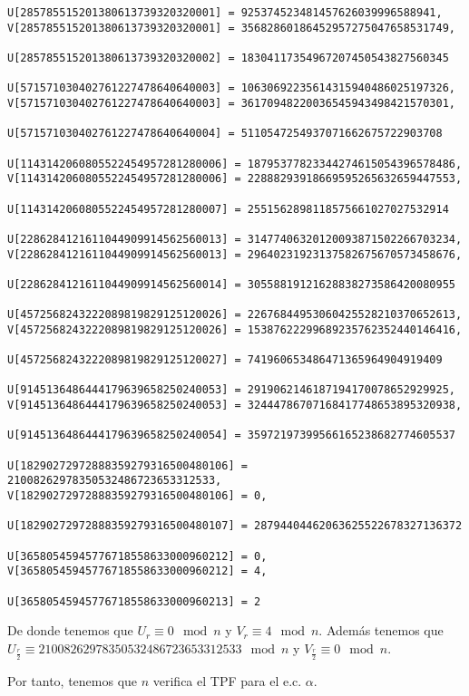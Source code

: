 \documentclass[a4paper]{article}
\begin{document}
\begin{verbatim}
U[285785515201380613739320320001] = 925374523481457626039996588941, 
V[285785515201380613739320320001] = 35682860186452957275047658531749, 

U[285785515201380613739320320002] = 18304117354967207450543827560345

U[571571030402761227478640640003] = 10630692235614315940486025197326, 
V[571571030402761227478640640003] = 36170948220036545943498421570301, 

U[571571030402761227478640640004] = 5110547254937071662675722903708

U[1143142060805522454957281280006] = 18795377823344274615054396578486, 
V[1143142060805522454957281280006] = 22888293918669595265632659447553, 

U[1143142060805522454957281280007] = 2551562898118575661027027532914

U[2286284121611044909914562560013] = 31477406320120093871502266703234, 
V[2286284121611044909914562560013] = 29640231923137582675670573458676, 

U[2286284121611044909914562560014] = 30558819121628838273586420080955

U[4572568243222089819829125120026] = 22676844953060425528210370652613, 
V[4572568243222089819829125120026] = 15387622299689235762352440146416, 

U[4572568243222089819829125120027] = 741960653486471365964904919409

U[9145136486444179639658250240053] = 2919062146187194170078652929925, 
V[9145136486444179639658250240053] = 32444786707168417748653895320938, 

U[9145136486444179639658250240054] = 35972197399566165238682774605537

U[18290272972888359279316500480106] = 21008262978350532486723653312533, 
V[18290272972888359279316500480106] = 0, 

U[18290272972888359279316500480107] = 28794404462063625522678327136372

U[36580545945776718558633000960212] = 0, 
V[36580545945776718558633000960212] = 4, 

U[36580545945776718558633000960213] = 2
\end{verbatim}

De donde tenemos que $U_r \equiv 0\mod n$ y $V_r\equiv 4\mod n$. Además tenemos que $U_{\frac{r}{2}}\equiv 21008262978350532486723653312533\mod n$ y $V_{\frac{r}{2}}\equiv 0\mod n$.

Por tanto, tenemos que $n$ verifica el TPF para el e.c. $\alpha$.
\end{document}
